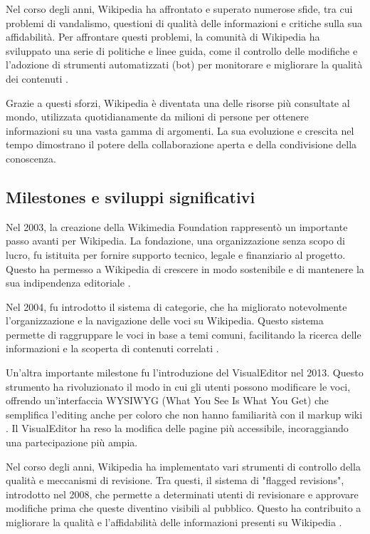 \documentclass[12pt,a4paper]{report}
\begin{document}
Nel corso degli anni, Wikipedia ha affrontato e superato numerose sfide, tra cui problemi di vandalismo, questioni di qualità delle informazioni e critiche sulla sua affidabilità. Per affrontare questi problemi, la comunità di Wikipedia ha sviluppato una serie di politiche e linee guida, come il controllo delle modifiche e l'adozione di strumenti automatizzati (bot) per monitorare e migliorare la qualità dei contenuti \cite{jemielniak2014wikipedia}.

Grazie a questi sforzi, Wikipedia è diventata una delle risorse più consultate al mondo, utilizzata quotidianamente da milioni di persone per ottenere informazioni su una vasta gamma di argomenti. La sua evoluzione e crescita nel tempo dimostrano il potere della collaborazione aperta e della condivisione della conoscenza.

\subsection{Milestones e sviluppi significativi}

Nel 2003, la creazione della Wikimedia Foundation rappresentò un importante passo avanti per Wikipedia. La fondazione, una organizzazione senza scopo di lucro, fu istituita per fornire supporto tecnico, legale e finanziario al progetto. Questo ha permesso a Wikipedia di crescere in modo sostenibile e di mantenere la sua indipendenza editoriale \cite{reagle2010good}.

Nel 2004, fu introdotto il sistema di categorie, che ha migliorato notevolmente l'organizzazione e la navigazione delle voci su Wikipedia. Questo sistema permette di raggruppare le voci in base a temi comuni, facilitando la ricerca delle informazioni e la scoperta di contenuti correlati \cite{jemielniak2014wikipedia}.

Un'altra importante milestone fu l'introduzione del VisualEditor nel 2013. Questo strumento ha rivoluzionato il modo in cui gli utenti possono modificare le voci, offrendo un'interfaccia WYSIWYG (What You See Is What You Get) che semplifica l'editing anche per coloro che non hanno familiarità con il markup wiki \cite{history_of_wikis}. Il VisualEditor ha reso la modifica delle pagine più accessibile, incoraggiando una partecipazione più ampia.

Nel corso degli anni, Wikipedia ha implementato vari strumenti di controllo della qualità e meccanismi di revisione. Tra questi, il sistema di "flagged revisions", introdotto nel 2008, che permette a determinati utenti di revisionare e approvare modifiche prima che queste diventino visibili al pubblico. Questo ha contribuito a migliorare la qualità e l'affidabilità delle informazioni presenti su Wikipedia \cite{denning2005wikipedia}.
\end{document}
